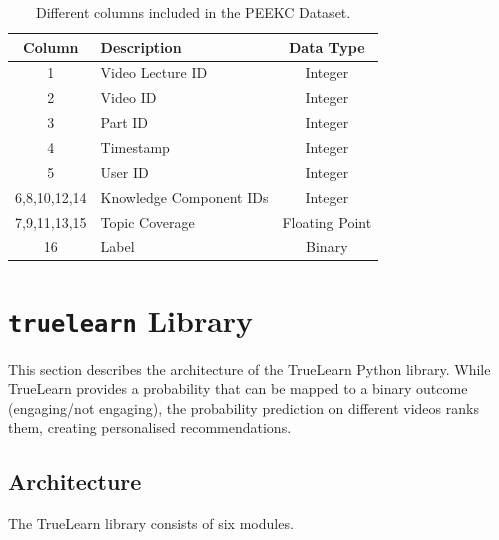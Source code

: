 \documentclass[letterpaper]{article} %
\begin{document}
\begin{table}[] \small
\caption{Different columns included in the PEEKC Dataset.}
\label{tab:features}
\centering 
\begin{tabular}{clc}
\hline
Column & Description & Data Type\\
\hline
1 & Video Lecture ID & Integer\\
2 & Video ID & Integer \\
3 & Part ID & Integer\\
4 & Timestamp & Integer \\
5 & User ID & Integer \\
6,8,10,12,14 & Knowledge Component IDs & Integer\\
7,9,11,13,15 & Topic Coverage & Floating Point\\ 
16 & Label & Binary\\
\hline
\end{tabular}
\end{table}


\section{\texttt{truelearn} Library}

This section describes the architecture of the TrueLearn Python library. While TrueLearn provides a probability that can be mapped to a binary outcome (engaging/not engaging), the probability prediction on different videos ranks them, creating personalised recommendations.





\subsection{Architecture}

The TrueLearn library consists of six modules.
\end{document}

